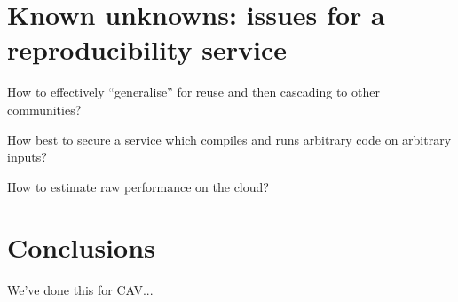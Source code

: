 \documentclass{llncs}
\begin{document}
\section{Known unknowns: issues for a reproducibility service}\label{issues} 

How to effectively ``generalise'' for reuse and then cascading to other communities?

How best to secure a service which compiles and runs arbitrary code on arbitrary inputs?

How to estimate raw performance on the cloud?

\section{Conclusions}\label{concl}
We've done this for CAV...





\end{document}
